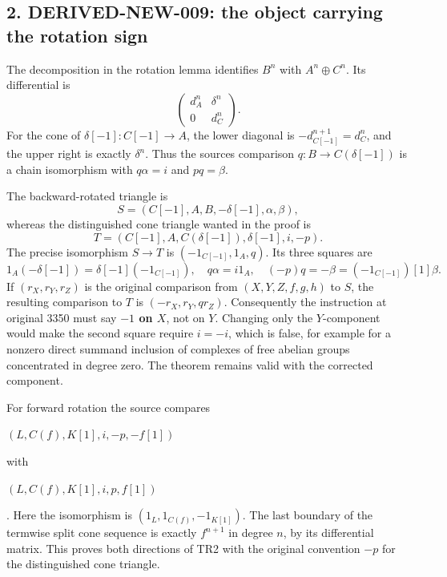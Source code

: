 \subsection{\texorpdfstring{2. DERIVED-NEW-009:\allowbreak{} the object carrying the rotation sign}{2.  the object carrying the rotation sign}}\label{proofs-2995-3485-derived-new-009-the-object-carrying-the-rotation-sign}

The decomposition in the rotation lemma identifies \(B^n\) with \(A^n\oplus C^n\). Its differential is \[
\begin{pmatrix}d_A^n&\delta^n\\0&d_C^n\end{pmatrix}.
\] For the cone of \(\delta[-1]:C[-1]\to A\),\allowbreak{} the lower diagonal is \(-d_{C[-1]}^{n+1}=d_C^n\),\allowbreak{} and the upper right is exactly \(\delta^n\). Thus the source\textquotesingle s comparison \(q:B\to C(\delta[-1])\) is a chain isomorphism with \(q\alpha=i\) and \(pq=\beta\).

The backward-rotated triangle is \[
S=(C[-1],A,B,-\delta[-1],\alpha,\beta),
\] whereas the distinguished cone triangle wanted in the proof is \[
T=(C[-1],A,C(\delta[-1]),\delta[-1],i,-p).
\] The precise isomorphism \(S\to T\) is \((-1_{C[-1]},1_A,q)\). Its three squares are \[
1_A(-\delta[-1])=\delta[-1](-1_{C[-1]}),\quad
q\alpha=i1_A,\quad (-p)q=-\beta=(-1_{C[-1]})[1]\beta.
\] If \((r_X,r_Y,r_Z)\) is the original comparison from \((X,Y,Z,f,g,h)\) to \(S\),\allowbreak{} the resulting comparison to \(T\) is \((-r_X,r_Y,qr_Z)\). Consequently the instruction at original 3350 must say \textbf{\(-1\) on \(X\)},\allowbreak{} not on \(Y\). Changing only the \(Y\)-component would make the second square require \(i=-i\),\allowbreak{} which is false,\allowbreak{} for example for a nonzero direct summand inclusion of complexes of free abelian groups concentrated in degree zero. The theorem remains valid with the corrected component.

For forward rotation the source compares 
\par\noindent \((L,C(f),K[1],i,-p,-f[1])\)\par\noindent
 with 
\par\noindent \((L,C(f),K[1],i,p,f[1])\)\par\noindent
. Here the isomorphism is \((1_L,1_{C(f)},-1_{K[1]})\). The last boundary of the termwise split cone sequence is exactly \(f^{n+1}\) in degree \(n\),\allowbreak{} by its differential matrix. This proves both directions of TR2 with the original convention \(-p\) for the distinguished cone triangle.

